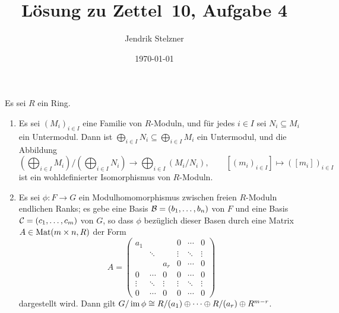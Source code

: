 \documentclass[a4paper,10pt,numbers=noenddot]{scrartcl}
\title{Lösung zu Zettel~10, Aufgabe 4}
\author{Jendrik Stelzner}
\date{\today}
\begin{document}
\maketitle





\begin{lemma}
  \label{lemma: quotients via diagonal matrices}
  Es sei $R$ ein Ring.
  \begin{enumerate}
    \item
      Es sei $(M_i)_{i \in I}$ eine Familie von $R$-Moduln, und für jedes $i \in I$ sei $N_i \subseteq M_i$ ein Untermodul.
      Dann ist $\bigoplus_{i \in I} N_i \subseteq \bigoplus_{i \in I} M_i$ ein Untermodul, und die Abbildung
      \[
            \left( \bigoplus_{i \in I} M_i \right) / \left( \bigoplus_{i \in I} N_i \right)
        \to \bigoplus_{i \in I} (M_i / N_i),
        \qquad
        [(m_i)_{i \in I}] \mapsto ([m_i])_{i \in I}
      \]
      ist ein wohldefinierter Isomorphismus von $R$-Moduln.
    \item
      Es sei $\phi \colon F \to G$ ein Modulhomomorphismus zwischen freien $R$-Moduln endlichen Ranks;
      es gebe eine Basis $\mathcal{B} = (b_1, \dotsc, b_n)$ von $F$ und eine Basis $\mathcal{C} = (c_1, \dotsc, c_m)$ von $G$, so dass $\phi$ bezüglich dieser Basen durch eine Matrix $A \in \operatorname{Mat}(m \times n, R)$ der Form
      \[
          A
        = \begin{pmatrix}
            a_1     &         &         & 0       & \cdots  & 0       \\
                    & \ddots  &         & \vdots  & \ddots  & \vdots  \\
                    &         & a_r     & 0       & \cdots  & 0       \\
            0       & \cdots  & 0       & 0       & \cdots  & 0       \\
            \vdots  & \ddots  & \vdots  & \vdots  & \ddots  & \vdots  \\
            0       & \cdots  & 0       & 0       & \cdots  & 0
          \end{pmatrix}
      \]
      dargestellt wird.
      Dann gilt $G / \operatorname{im} \phi \cong R/(a_1) \oplus \dotsb \oplus R/(a_r) \oplus R^{m-r}$.
  \end{enumerate}
\end{lemma}
\end{document}
